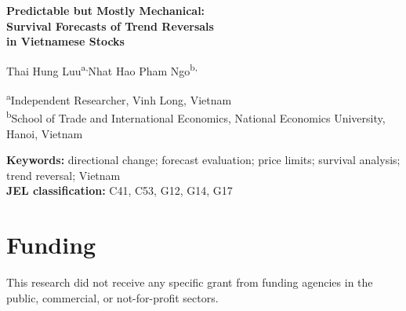 \documentclass[11pt]{article}
\begin{document}
\thispagestyle{plain}
\renewcommand{\thefootnote}{\fnsymbol{footnote}}
\begin{center}
{\LARGE\bfseries Predictable but Mostly Mechanical:\\[0.3ex] Survival Forecasts of Trend Reversals\\[0.3ex]
in Vietnamese Stocks\par}
\vspace{1.4em}
{\large Thai Hung Luu\textsuperscript{a,}\footnotemark[1] \qquad Nhat Hao Pham Ngo\textsuperscript{b,}\footnotemark[2]\par}
\vspace{0.8em}
{\small\textsuperscript{a}Independent Researcher, Vinh Long, Vietnam\\
\textsuperscript{b}School of Trade and International Economics, National Economics University,
Hanoi, Vietnam\par}
\end{center}


\vspace{1em}
\begin{abstract}
\noindent
\end{abstract}

\noindent\textbf{Keywords:} directional change; forecast evaluation; price limits; survival
analysis; trend reversal; Vietnam\\
\noindent\textbf{JEL classification:} C41, C53, G12, G14, G17

\clearpage
\setcounter{footnote}{0}
\renewcommand{\thefootnote}{\arabic{footnote}}










\section*{Funding}
This research did not receive any specific grant from funding agencies in the public, commercial,
or not-for-profit sectors.
\end{document}
